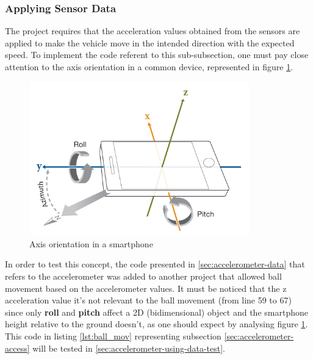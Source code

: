 \subsubsection{Applying Sensor Data}
\label{sec:using-accelerometer-data}
%
The project requires that the acceleration values obtained from the sensors are applied to make the vehicle move in the intended direction with the expected speed. 
%
To implement the code referent to this sub-subsection, one must pay close attention to the axis orientation in a common device, represented in figure \ref{fig:axis-smartphone}.
%
\begin{figure}[!h]
\centering
\includegraphics[width=0.85\textwidth]{img/smartphone_axis.png}
\caption{\label{fig:axis-smartphone}Axis orientation in a smartphone}
\end{figure}
%
In order to test this concept, the code presented in \ref{sec:accelerometer-data} that refers to the accelerometer was added to another project that allowed ball movement based on the accelerometer values. It must be noticed that the z acceleration value it's not relevant to the ball movement (from line 59 to 67) since only \textbf{roll} and \textbf{pitch} affect a 2D (bidimensional) object and the smartphone height relative to the ground doesn't, as one should expect by analysing figure \ref{fig:axis-smartphone}.
%
This code in listing \ref{lst:ball_mov} representing subsection \ref{sec:accelerometer-access} will be tested in \ref{sec:accelerometer-using-data-test}.\\
%

%